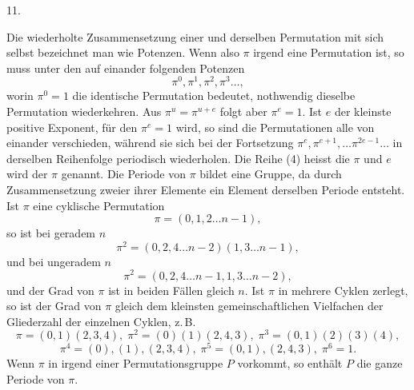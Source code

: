 11. 

Die wiederholte Zusammensetzung einer und derselben Permutation mit
sich selbst bezeichnet man wie Potenzen. Wenn
also $\pi$ irgend eine Permutation ist, so muss unter den auf einander
folgenden Potenzen
\[
\pi^0, \pi^1, \pi^2, \pi^3 \ldots,
\]
worin $\pi^0 = 1$ die identische Permutation bedeutet, nothwendig
dieselbe Permutation wiederkehren. Aus $\pi^u = \pi^{u+e}$ folgt aber
$\pi^e = 1$. Ist $e$ der kleinste positive Exponent, für den $\pi^e = 1$
wird, so sind die Permutationen
alle von einander verschieden, während sie sich bei der Fortsetzung $\pi^e, \pi^{e+1}, \ldots \pi^{2e-1} \ldots$ in derselben Reihenfolge periodisch
wiederholen. Die Reihe (4) heisst die 
$\pi$ und $e$ wird der  $\pi$ genannt. Die Periode
von $\pi$ bildet eine Gruppe, da durch Zusammensetzung zweier
ihrer Elemente ein Element derselben Periode entsteht.
Ist $\pi$ eine cyklische Permutation
\[
\pi = (0, 1, 2 \ldots n - 1),
\]
so ist bei geradem $n$
\[
\pi^2 = (0, 2, 4 \ldots n - 2) (1, 3 \ldots n - 1),
\]
und bei ungeradem $n$
\[
\pi^2 = (0, 2, 4 \ldots n - 1, 1, 3 \ldots n - 2),
\]
und der Grad von $\pi$ ist in beiden Fällen gleich $n$.
Ist $\pi$ in mehrere Cyklen zerlegt, so ist der Grad von $\pi$
gleich dem kleinsten gemeinschaftlichen Vielfachen der Gliederzahl der einzelnen Cyklen, z.\,B.
\[
\pi = (0, 1) (2, 3, 4), \; \pi^2 = (0) (1) (2, 4, 3), \; \pi^3 = (0, 1) (2) (3) (4),
\]
\[
\pi^4 = (0), (1), (2, 3, 4), \; \pi^5 = (0, 1), (2, 4, 3), \; \pi^6 = 1.
\]
Wenn $\pi$ in irgend einer Permutationsgruppe $P$ vorkommt,
so enthält $P$ die ganze Periode von $\pi$.
